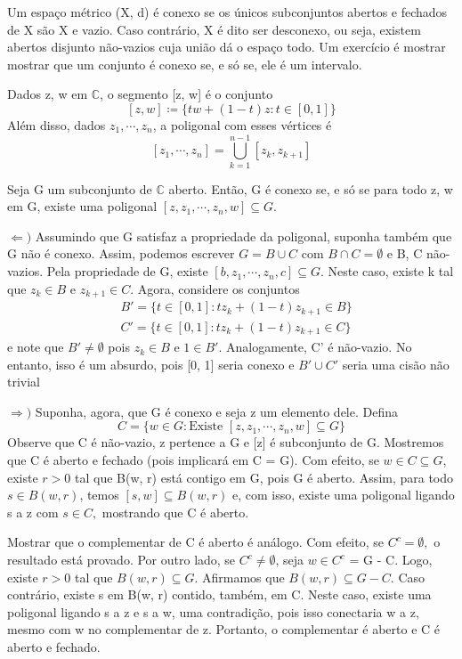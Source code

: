 \documentclass[ComplexAnalysis/complex.tex]{subfiles}
\begin{document}
Um espaço métrico (X, d) é conexo se os únicos subconjuntos abertos e fechados de X são X e vazio. Caso contrário,
X é dito ser desconexo, ou seja, existem abertos disjunto não-vazios cuja união dá o espaço todo. Um exercício é mostrar
mostrar que um conjunto é conexo se, e só se, ele é um intervalo.

Dados z, w em $\mathbb{C}$, o segmento [z, w] é o conjunto
$$
	[z, w]\coloneqq  \{tw + (1-t)z: t\in[0, 1]\}
$$
Além disso, dados $z _{1}, \cdots, z _{n}$, a poligonal com esses vértices é
$$
	[z _{1}, \cdots, z _{n}] = \bigcup _{k=1}^{n-1}[z _{k}, z _{k+1}]
$$
\begin{prop*}
	Seja G um subconjunto de $\mathbb{C}$ aberto. Então, G é conexo se, e só se para todo z, w em G, existe uma poligonal
	$[z, z _{1}, \cdots, z _{n}, w]\subseteq{G}.$
\end{prop*}
\begin{proof*}
	$\Leftarrow)$ Assumindo que G satisfaz a propriedade da poligonal, suponha também que G não é conexo. Assim,
	podemos escrever $G = B\cup{C}$ com $B\cap{C}=\emptyset$ e B, C não-vazios. Pela propriedade de G, existe
	$[b, z _{1}, \cdots, z _{n}, c]\subseteq{G}$. Neste caso, existe k tal que $z _{k}\in{B}$ e $z _{k+1}\in{C}.$ Agora,
	considere os conjuntos
	\begin{align*}
		 & B' = \{t\in[0, 1]: tz _{k} + (1 - t)z _{k+1}\in{B}\} \\
		 & C' = \{t\in[0, 1]: tz _{k} + (1 - t)z _{k+1}\in{C}\}
	\end{align*}
	e note que $B'\neq{\emptyset}$ pois $z _{k}\in{B}$ e $1\in{B'}$. Analogamente, C' é não-vazio. No entanto, isso é um absurdo,
	pois [0, 1] seria conexo e $B'\cup{C'}$ seria uma cisão não trivial

	$\Rightarrow)$ Suponha, agora, que G é conexo e seja z um elemento dele. Defina
	$$
		C = \{w\in{G}: \text{Existe } [z, z _{1}, \cdots, z _{n}, w]\subseteq{G}\}
	$$
	Observe que C é não-vazio, z pertence a G e [z] é subconjunto de G. Mostremos que C é aberto e fechado (pois implicará em C = G).
	Com efeito, se $w\in{C}\subseteq{G}$, existe $r>0$ tal que B(w, r) está contigo em G, pois G é aberto.
	Assim, para todo $s\in B(w, r)$, temos $[s, w]\subseteq{B(w, r)}$ e, com isso, existe uma poligonal ligando s a z com $s\in{C},$ mostrando
	que C é aberto.

	Mostrar que o complementar de C é aberto é análogo. Com efeito, se $C ^{c} = \emptyset,$ o resultado está provado. Por outro
	lado, se $C ^{c}\neq\emptyset$, seja $w\in{C ^{c}}$ = G - C. Logo, existe $r > 0$ tal que $B(w, r)\subseteq{G}$. Afirmamos
	que $B(w, r)\subseteq{G-C}$. Caso contrário, existe s em B(w, r) contido, também, em C. Neste caso, existe uma poligonal
	ligando s a z e s a w, uma contradição, pois isso conectaria w a z, mesmo com w no complementar de z. Portanto, o complementar
	é aberto e C é aberto e fechado. \qedsymbol
\end{proof*}
\end{document}
